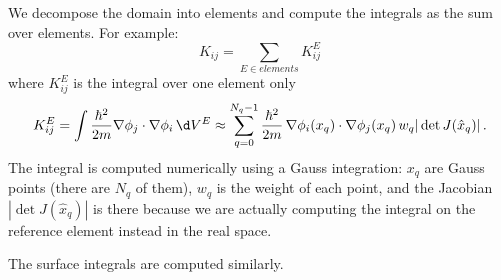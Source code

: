 We decompose the domain into elements and compute the integrals as the sum over
elements. For example:
$$K_{ij}=\sum_{E\in elements} K_{ij}^E$$
where $K_{ij}^E$ is the integral over one element only
$$
K_{ij}^{E}=\int{\hbar^2\over2m}\nabla\phi_j\cdot\nabla\phi_i\,\d V^{E}\approx
\sum_{q=0}^{N_q-1}{\hbar^2\over2m}\,\nabla\phi_i(x_q)\cdot\nabla\phi_j(x_q)\,
w_q|\det J(\hat x_q)|\,.
$$
The integral is computed numerically using a Gauss integration: $x_q$ are Gauss
points (there are $N_q$ of them), $w_q$ is the weight of each point, and the
Jacobian $|\det J(\hat x_q)|$ is there because we are actually computing the
integral on the reference element instead in the real space.

The surface integrals are computed similarly.
